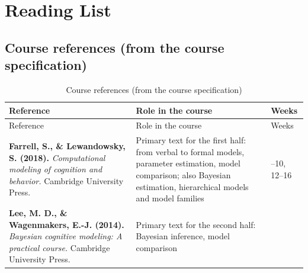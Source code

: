 
\section{Reading List}

\subsection{Course references (from the course specification)}

\begin{longtable}[]{@{}
  >{\raggedright\arraybackslash}p{}
  >{\raggedright\arraybackslash}p{}
  >{\raggedright\arraybackslash}p{}@{}}
\caption{\centering Course references (from the course specification)}\tabularnewline
\toprule\noalign{}
\begin{minipage}[b]{\linewidth}\raggedright
Reference
\end{minipage} & \begin{minipage}[b]{\linewidth}\raggedright
Role in the course
\end{minipage} & \begin{minipage}[b]{\linewidth}\raggedright
Weeks
\end{minipage} \\
\midrule\noalign{}
\endfirsthead
\toprule\noalign{}
\begin{minipage}[b]{\linewidth}\raggedright
Reference
\end{minipage} & \begin{minipage}[b]{\linewidth}\raggedright
Role in the course
\end{minipage} & \begin{minipage}[b]{\linewidth}\raggedright
Weeks
\end{minipage} \\
\midrule\noalign{}
\endhead
\bottomrule\noalign{}
\endlastfoot
\textbf{Farrell, S., \& Lewandowsky, S. (2018).} \emph{Computational
modeling of cognition and behavior.} Cambridge University Press. &
Primary text for the first half: from verbal to formal models, parameter
estimation, model comparison; also Bayesian estimation, hierarchical
models and model families & 1--10, 12--16 \\
\textbf{Lee, M. D., \& Wagenmakers, E.-J. (2014).} \emph{Bayesian
cognitive modeling: A practical course.} Cambridge University Press. &
Primary text for the second half: Bayesian inference, model comparison

\end{longtable}
